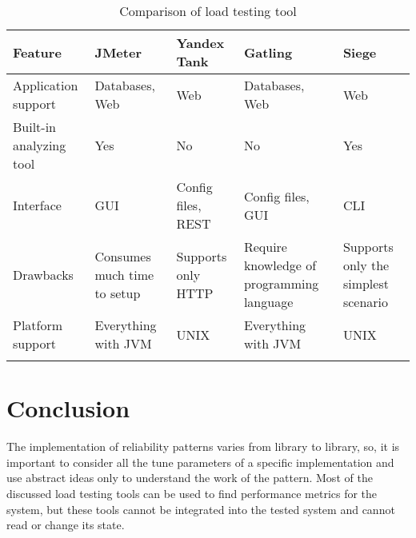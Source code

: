 \begin{longtable}[c]{|p{4cm}|p{2.5cm}|p{2.5cm}|p{2.5cm}|p{2.5cm}|}
    \hline
    \textbf{Feature}        & \textbf{JMeter}             & \textbf{Yandex Tank} & \textbf{Gatling}                          & \textbf{Siege}                      \\
    \endhead
    \hline
    Application support     & Databases, Web              & Web                  & Databases, Web                            & Web                                 \\
    \hline
    Built-in analyzing tool & Yes                         & No                   & No                                        & Yes                                 \\
    \hline
    Interface               & GUI                         & Config files, REST   & Config files, GUI                         & CLI                                 \\
    \hline
    Drawbacks               & Consumes much time to setup & Supports only HTTP   & Require knowledge of programming language               & Supports only the simplest scenario              \\
    \hline
    Platform support        & Everything with JVM         & UNIX                 & Everything with JVM                       & UNIX                                \\
    \hline
    \caption{Comparison of load testing tool}
    \label{tab:load_tools} \\
\end{longtable}


\section{Conclusion}\label{sec:review_conclusion}
The implementation of reliability patterns varies from library to library, so, it is important to consider all the tune parameters of a specific implementation and use abstract ideas only to understand the work of the pattern.
Most of the discussed load testing tools can be used to find performance metrics for the system, but these tools cannot be integrated into the tested system and cannot read or change its state.